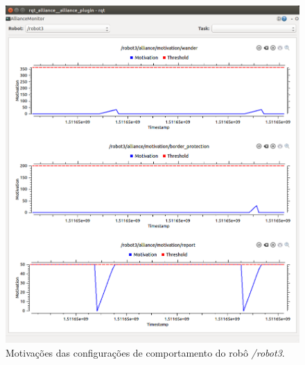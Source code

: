             \begin{figure}
                \centering
                \includegraphics[width=\textwidth]{Figuras/4_resultados/rqt_alliance4.png}
                \caption{Motivações das configurações de comportamento do robô \textit{/robot3}.}
                \label{fig:rqt_alliance_motivations}
            \end{figure}
            

